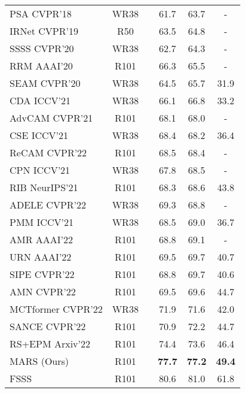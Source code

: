 \documentclass[10pt,twocolumn,letterpaper]{article}
\begin{document}
\begin{table}[t]
\begin{scriptsize}
\begin{tabular}{p{} c c c c c}
    \hline
    PSA {\tiny CVPR'18} \cite{ahn2018learning} & WR38 &  & 61.7 & 63.7 & - \\
    IRNet {\tiny CVPR'19} \cite{ahn2019weakly} & R50 &  & 63.5 & 64.8 & - \\
    SSSS {\tiny CVPR'20} \cite{araslanov2020single} & WR38 &  & 62.7 & 64.3 & - \\
RRM {\tiny AAAI'20} \cite{zhang2020reliability} & R101 &  & 66.3 & 65.5 & - \\
SEAM {\tiny CVPR'20} \cite{wang2020self} & WR38 &  & 64.5 & 65.7 & 31.9 \\
CDA {\tiny ICCV'21} \cite{su2021context} & WR38 &  & 66.1 & 66.8 & 33.2 \\
    AdvCAM {\tiny CVPR'21} \cite{lee2021anti} & R101 &  & 68.1 & 68.0 & - \\
    CSE {\tiny ICCV'21} \cite{kweon2021unlocking} & WR38 &  & 68.4 & 68.2 & 36.4 \\
    ReCAM {\tiny CVPR'22} \cite{chen2022class} & R101 &  & 68.5 & 68.4 & - \\
    CPN {\tiny ICCV'21} \cite{zhang2021complementary} & WR38 &  & 67.8 & 68.5 & - \\
    RIB {\tiny NeurIPS'21} \cite{lee2021reducing} & R101 &  & 68.3 & 68.6 & 43.8 \\
    ADELE {\tiny CVPR'22} \cite{liu2022adaptive} & WR38 &  & 69.3 & 68.8 & - \\
    PMM {\tiny ICCV'21} \cite{li2021pseudo} & WR38 &  & 68.5 & 69.0 & 36.7 \\
    AMR {\tiny AAAI'22} \cite{qin2022activation} & R101 &  & 68.8 & 69.1 & - \\
    URN {\tiny AAAI'22} \cite{li2022uncertainty} & R101 &  & 69.5 & 69.7 & 40.7 \\ 
    SIPE {\tiny CVPR'22} \cite{chen2022self} & R101 &  & 68.8 & 69.7 & 40.6 \\
    AMN {\tiny CVPR'22} \cite{lee2022threshold} & R101 &  & 69.5 & 69.6 & 44.7 \\
    MCTformer {\tiny CVPR'22} \cite{xu2022multi} & WR38 &  & 71.9 & 71.6 & 42.0 \\
    SANCE {\tiny CVPR'22} \cite{li2022towards} & R101 &  & 70.9 & 72.2 & 44.7 \\
    RS+EPM {\tiny Arxiv'22} \cite{jo2022recurseed} & R101 &  & 74.4 & 73.6 & 46.4 \\
\rowcolor{maroon!25} MARS (Ours) & R101 &  & \textbf{77.7} & \textbf{77.2} & \textbf{49.4} \\
    FSSS & R101 &  & 80.6 & 81.0 & 61.8 \\ \bottomrule
  \end{tabular} 
  \label{tab:performance}
  \end{scriptsize}
  \vspace{-0.2cm}
\end{table}
\end{document}
